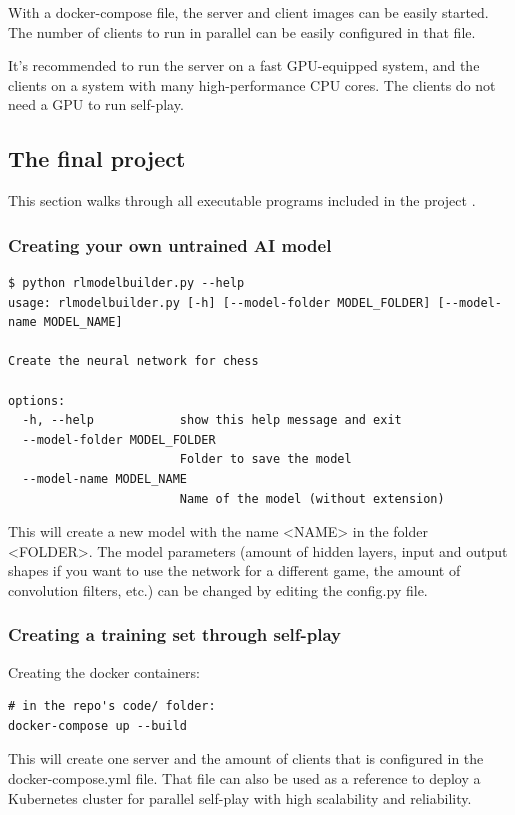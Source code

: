 \documentclass{article}
\begin{document}
With a docker-compose file, the server and client images can be easily started. The number of clients 
to run in parallel can be easily configured in that file.

It's recommended to run the server on a fast GPU-equipped system, and the clients on a system with many high-performance CPU cores.
The clients do not need a GPU to run self-play.

\subsection{The final project}

This section walks through all executable programs included in the project \cite{zjefferChessEngineDeep2022}.

\subsubsection{Creating your own untrained AI model}

\begin{verbatim}
$ python rlmodelbuilder.py --help
usage: rlmodelbuilder.py [-h] [--model-folder MODEL_FOLDER] [--model-name MODEL_NAME]

Create the neural network for chess

options:
  -h, --help            show this help message and exit
  --model-folder MODEL_FOLDER
                        Folder to save the model
  --model-name MODEL_NAME
                        Name of the model (without extension)
\end{verbatim}

This will create a new model with the name <NAME> in the folder <FOLDER>.
The model parameters (amount of hidden layers, input and output shapes if you want to use the network for a different game, the amount of convolution filters, etc.)
can be changed by editing the config.py file.

\subsubsection{Creating a training set through self-play}

Creating the docker containers:

\begin{verbatim}
# in the repo's code/ folder:
docker-compose up --build
\end{verbatim}

This will create one server and the amount of clients that is configured in the docker-compose.yml file.
That file can also be used as a reference to deploy a Kubernetes cluster for parallel self-play with 
high scalability and reliability. 
\end{document}
